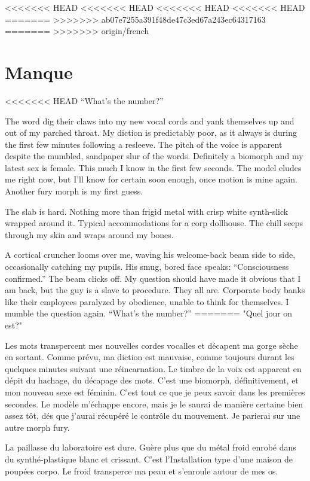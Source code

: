 <<<<<<< HEAD
<<<<<<< HEAD
<<<<<<< HEAD
<<<<<<< HEAD
=======
>>>>>>> ab07e7255a391f48de47c3ed67a243ec64317163
=======
>>>>>>> origin/french
\chapter{Manque} \label{chap:lack} 

<<<<<<< HEAD
``What's the number?'' 

The word dig their claws into my new vocal cords and yank themselves up and out of my parched throat. My diction is predictably poor, as it always is during the first few minutes following a resleeve. The pitch of the voice is apparent despite the mumbled, sandpaper slur of the words. Definitely a biomorph and my latest sex is female. This much I know in the first few seconds. The model eludes me right now, but I'll know for certain soon enough, once motion is mine again. Another fury morph is my first guess. 

The slab is hard. Nothing more than frigid metal with crisp white synth-slick wrapped around it. Typical accommodations for a corp dollhouse. The chill seeps through my skin and wraps around my bones. 

A cortical cruncher looms over me, waving his welcome-back beam side to side, occasionally catching my pupils. His smug, bored face speaks: ``Consciousness confirmed.'' The beam clicks off. My question should have made it obvious that I am back, but the guy is a slave to procedure. They all are. Corporate body banks like their employees paralyzed by obedience, unable to think for themselves. I mumble the question again. ``What's the number?'' 
=======
"Quel jour on est?" 

Les mots transpercent mes nouvelles cordes vocalles et décapent ma gorge sèche en sortant. Comme prévu, ma diction est mauvaise, comme toujours durant les quelques minutes suivant une réincarnation. Le timbre de la voix est apparent en dépit du hachage, du décapage des mots. C'est une biomorph, définitivement, et mon nouveau sexe est féminin. C'est tout ce que je peux savoir dans les premières secondes. Le modèle m'échappe encore, mais je le saurai de manière certaine bien assez tôt, dés que j'aurai récupéré le contrôle du mouvement. Je parierai sur une autre morph fury. 

La paillasse du laboratoire est dure. Guère plus que du métal froid enrobé dans du synthé-plastique blanc et crissant. C'est l'Installation type d'une maison de poupées corpo. Le froid transperce ma peau et s'enroule autour de mes os. 

